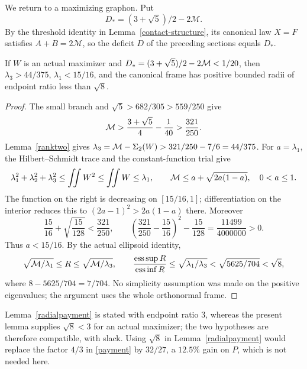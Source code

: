 We return to a maximizing graphon. Put
\[
 D_*=(3+\sqrt5)/2-2\mathcal M.
\]
By the threshold identity in Lemma~\ref{contact-structure}, its canonical
law $X=F$ satisfies $A+B=2\mathcal M$, so the deficit $D$ of the preceding
sections equals $D_*$.
\begin{lemma}\label{spectral-reserve}
If $W$ is an actual maximizer and $D_*=(3+\sqrt5)/2-2{\cal M}<1/20$,
then $\lambda_3>44/375$, $\lambda_1<15/16$, and the canonical frame
has positive bounded radii of endpoint ratio less than $\sqrt8$.
\end{lemma}
\begin{proof}
The small branch and $\sqrt5>682/305>559/250$ give
\[
 {\cal M}>\frac{3+\sqrt5}{4}-\frac1{40}>\frac{321}{250}.
\]
Lemma~\ref{ranktwo} gives
$\lambda_3={\cal M}-\Sigma_2(W)>321/250-7/6=44/375$.
For $a=\lambda_1$, the Hilbert--Schmidt trace and the constant-function trial give
\[
 \lambda_1^2+\lambda_2^2+\lambda_3^2\le\iint W^2\le\iint W\le\lambda_1,
 \qquad {\cal M}\le a+\sqrt{2a(1-a)},\quad 0<a\le1.
\]
The function on the right is decreasing on $[15/16,1]$; differentiation
on the interior reduces this to $(2a-1)^2>2a(1-a)$ there.
Moreover
\[
 \frac{15}{16}+\sqrt{\frac{15}{128}}<\frac{321}{250},\qquad
 \left(\frac{321}{250}-\frac{15}{16}\right)^2-\frac{15}{128}
       =\frac{11499}{4000000}>0.
\]
Thus $a<15/16$. By the actual ellipsoid identity,
\[
 \sqrt{{\cal M}/\lambda_1}\le R\le\sqrt{{\cal M}/\lambda_3},\qquad
 \frac{\operatorname{ess\,sup} R}{\operatorname{ess\,inf} R}
 \le\sqrt{\lambda_1/\lambda_3}<\sqrt{5625/704}<\sqrt8,
\]
where $8-5625/704=7/704$. No simplicity assumption was made on
the positive eigenvalues; the argument uses the whole orthonormal frame.
\end{proof}

\begin{remark}\label{rem-radii}
Lemma~\ref{radialpayment} is stated with endpoint ratio $3$, whereas the
present lemma supplies $\sqrt8<3$ for an actual maximizer; the two
hypotheses are therefore compatible, with slack. Using $\sqrt8$ in
Lemma~\ref{radialpayment} would replace the factor $4/3$ in \eqref{payment}
by $32/27$, a $12.5\%$ gain on $P$, which is not needed here.
\end{remark}
